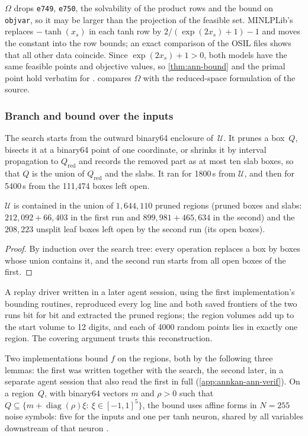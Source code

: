 $\Omega$ drops \texttt{e749}, \texttt{e750}, the solvability of the product rows and the bound on \texttt{objvar}, so it may be larger than the projection of the feasible set.
MINLPLib's  replaces $-\tanh(x_s)$ in each tanh row by $2/(\exp(2x_s)+1)-1$ and moves the constant into the row bounds; an exact comparison of the OSIL files shows that all other data coincide.
Since $\exp(2x_s)+1>0$, both models have the same feasible points and objective values, so \cref{thm:ann-bound} and the primal point hold verbatim for .
 compares $\Omega$ with the reduced-space formulation of the source.

\subsubsection{Branch and bound over the inputs}\label{app:annkan-ann-bb}

The search starts from the outward binary64 enclosure of~$\mathcal U$.
It prunes a box~$Q$, bisects it at a binary64 point of one coordinate, or shrinks it by interval propagation to $Q_{\mathrm{red}}$ and records the removed part as at most ten slab boxes, so that $Q$ is the union of $Q_{\mathrm{red}}$ and the slabs.
It ran for 1800\,s from $\mathcal U$, and then for 5400\,s from the 111,474 boxes left open.

\begin{lemma}[covering]\label{lem:ann-cover}
$\mathcal U$ is contained in the union of $1{,}644{,}110$ pruned regions (pruned boxes and slabs: $212{,}092+66{,}403$ in the first run and $899{,}981+465{,}634$ in the second) and the $208{,}223$ unsplit leaf boxes left open by the second run (its open boxes).
\end{lemma}

\begin{proof}
By induction over the search tree: every operation replaces a box by boxes whose union contains it, and the second run starts from all open boxes of the first.
\end{proof}

A replay driver written in a later agent session, using the first implementation's bounding routines, reproduced every log line and both saved frontiers of the two runs bit for bit and extracted the pruned regions; the region volumes add up to the start volume to 12 digits, and each of 4000 random points lies in exactly one region.
The covering argument trusts this reconstruction.

Two implementations bound $f$ on the regions, both by the following three lemmas: the first was written together with the search, the second later, in a separate agent session that also read the first in full (\cref{app:annkan-ann-verif}).
On a region~$Q$, with binary64 vectors $m$ and $\rho>0$ such that $Q\subseteq\{m+\operatorname{diag}(\rho)\xi:\ \xi\in[-1,1]^5\}$, the bound uses affine forms in $N=255$ noise symbols: five for the inputs and one per tanh neuron, shared by all variables downstream of that neuron \citep{stolfi2003-an-introduction-to-affine-arithmetic,messine2002-extensions-of-affine-arithmetic-application}.

